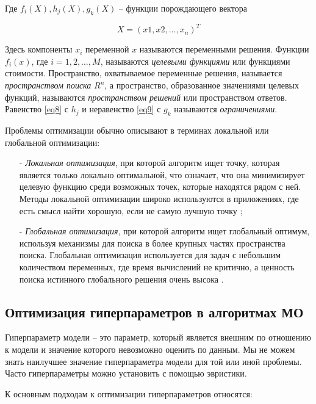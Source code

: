 Где $f_i(X), h_j(X), g_k(X)$ -- функции порождающего вектора

\begin{equation}\label{eq10}
    X = (x1,x2,\dots,x_n)^T
\end{equation}

Здесь компоненты $x_i$ переменной $x$ называются переменными решения.
Функции $f_i(x)$, где $i = 1, 2, \dots, M$, называются \emph{целевыми функциями}
или функциями стоимости. Пространство, охватываемое переменные решения, 
называется \emph{пространством поиска} $R^n$, а пространство, образованное значениями 
целевых функций, называются \emph{пространством решений} или пространством ответов. 
Равенство \eqref{eq8} с $h_j$ и неравенство \eqref{eq9} с $g_k$ называются \emph{ограничениями}. 

Проблемы оптимизации обычно описывают в терминах локальной или глобальной 
оптимизации:

\begin{itemize}
    \item[-]
    \emph{Локальная оптимизация}, при которой алгоритм ищет точку, которая является 
    только локально оптимальной, что означает, что она минимизирует целевую 
    функцию среди возможных точек, которые находятся рядом с ней. Методы локальной оптимизации широко используются в приложениях, где есть смысл 
    найти хорошую, если не самую лучшую точку \cite{Boyd2004};

    \item[-]
    \emph{Глобальная оптимизация}, при которой алгоритм ищет глобальный оптимум, 
    используя механизмы для поиска в более крупных частях пространства поиска.
    Глобальная оптимизация используется для задач с небольшим количеством 
    переменных, где время вычислений не критично, а ценность поиска истинного 
    глобального решения очень высока \cite{Boyd2004}.
\end{itemize}

\subsection{Оптимизация гиперпараметров в алгоритмах МО}\label{optimization}

Гиперпараметр модели -- это параметр, который является внешним по 
отношению к модели и значение которого невозможно оценить по данным.
Мы не можем знать наилучшее значение гиперпараметра модели для той или иной проблемы. 
Часто гиперпараметры можно установить с помощью эвристики.

К основным подходам к оптимизации гиперпараметров относятся:

